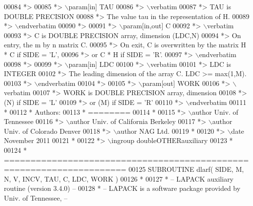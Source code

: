 \begin{DoxyCode}
00084 \textcolor{comment}{*>}
00085 \textcolor{comment}{*> \(\backslash\)param[in] TAU}
00086 \textcolor{comment}{*> \(\backslash\)verbatim}
00087 \textcolor{comment}{*>          TAU is DOUBLE PRECISION}
00088 \textcolor{comment}{*>          The value tau in the representation of H.}
00089 \textcolor{comment}{*> \(\backslash\)endverbatim}
00090 \textcolor{comment}{*>}
00091 \textcolor{comment}{*> \(\backslash\)param[in,out] C}
00092 \textcolor{comment}{*> \(\backslash\)verbatim}
00093 \textcolor{comment}{*>          C is DOUBLE PRECISION array, dimension (LDC,N)}
00094 \textcolor{comment}{*>          On entry, the m by n matrix C.}
00095 \textcolor{comment}{*>          On exit, C is overwritten by the matrix H * C if SIDE = 'L',}
00096 \textcolor{comment}{*>          or C * H if SIDE = 'R'.}
00097 \textcolor{comment}{*> \(\backslash\)endverbatim}
00098 \textcolor{comment}{*>}
00099 \textcolor{comment}{*> \(\backslash\)param[in] LDC}
00100 \textcolor{comment}{*> \(\backslash\)verbatim}
00101 \textcolor{comment}{*>          LDC is INTEGER}
00102 \textcolor{comment}{*>          The leading dimension of the array C. LDC >= max(1,M).}
00103 \textcolor{comment}{*> \(\backslash\)endverbatim}
00104 \textcolor{comment}{*>}
00105 \textcolor{comment}{*> \(\backslash\)param[out] WORK}
00106 \textcolor{comment}{*> \(\backslash\)verbatim}
00107 \textcolor{comment}{*>          WORK is DOUBLE PRECISION array, dimension}
00108 \textcolor{comment}{*>                         (N) if SIDE = 'L'}
00109 \textcolor{comment}{*>                      or (M) if SIDE = 'R'}
00110 \textcolor{comment}{*> \(\backslash\)endverbatim}
00111 \textcolor{comment}{*}
00112 \textcolor{comment}{*  Authors:}
00113 \textcolor{comment}{*  ========}
00114 \textcolor{comment}{*}
00115 \textcolor{comment}{*> \(\backslash\)author Univ. of Tennessee }
00116 \textcolor{comment}{*> \(\backslash\)author Univ. of California Berkeley }
00117 \textcolor{comment}{*> \(\backslash\)author Univ. of Colorado Denver }
00118 \textcolor{comment}{*> \(\backslash\)author NAG Ltd. }
00119 \textcolor{comment}{*}
00120 \textcolor{comment}{*> \(\backslash\)date November 2011}
00121 \textcolor{comment}{*}
00122 \textcolor{comment}{*> \(\backslash\)ingroup doubleOTHERauxiliary}
00123 \textcolor{comment}{*}
00124 \textcolor{comment}{*  =====================================================================}
00125 \textcolor{keyword}{      SUBROUTINE }dlarf( SIDE, M, N, V, INCV, TAU, C, LDC, WORK )
00126 \textcolor{comment}{*}
00127 \textcolor{comment}{*  -- LAPACK auxiliary routine (version 3.4.0) --}
00128 \textcolor{comment}{*  -- LAPACK is a software package provided by Univ. of Tennessee,    --}

\end{DoxyCode}
